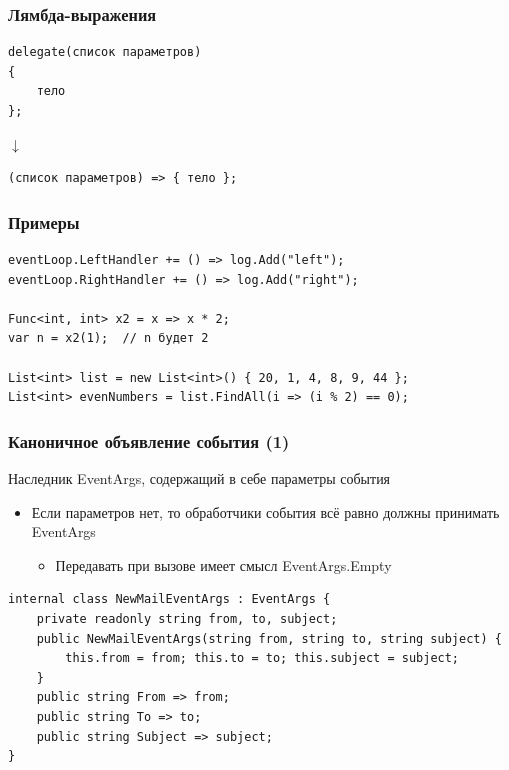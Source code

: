 \documentclass{../../slides-style}
\begin{document}
    \begin{frame}[fragile]
        \frametitle{Лямбда-выражения}
        \begin{verbatim}
delegate(список параметров)
{
    тело
};
        \end{verbatim}
        \hspace{2cm}\begin{LARGE}$\downarrow$\end{LARGE}
        \begin{verbatim}
(список параметров) => { тело };
        \end{verbatim}
    \end{frame}

    \begin{frame}[fragile]
        \frametitle{Примеры}
        \begin{verbatim}
eventLoop.LeftHandler += () => log.Add("left");
eventLoop.RightHandler += () => log.Add("right");

Func<int, int> x2 = x => x * 2;
var n = x2(1);  // n будет 2

List<int> list = new List<int>() { 20, 1, 4, 8, 9, 44 };
List<int> evenNumbers = list.FindAll(i => (i % 2) == 0);
        \end{verbatim}
    \end{frame}

    \begin{frame}[fragile]
        \frametitle{Каноничное объявление события (1)}
        Наследник EventArgs, содержащий в себе параметры события
        \begin{itemize}
            \item Если параметров нет, то обработчики события всё равно должны принимать EventArgs
            \begin{itemize}
                \item Передавать при вызове имеет смысл EventArgs.Empty
            \end{itemize}
        \end{itemize}

        \vspace{3mm}
        \begin{verbatim}
internal class NewMailEventArgs : EventArgs {
    private readonly string from, to, subject;
    public NewMailEventArgs(string from, string to, string subject) {
        this.from = from; this.to = to; this.subject = subject;
    }
    public string From => from;
    public string To => to;
    public string Subject => subject;
}
        \end{verbatim}
    \end{frame}
\end{document}
